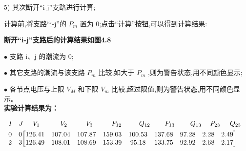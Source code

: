 \documentclass[a4paper]{ctexrep}
\begin{document}
                    5) 其次断开“i-j”支路进行计算;

                    计算前,将支路“i-j”的 $P_m$ 置为 0;点击“计算”按钮,可以得到计算结果:

                    \textbf{断开“i-j”支路后的计算结果如图4.8}

                    \quad $\bullet$ \quad 支路 i、j 的潮流为 0;

                    \quad $\bullet$ \quad 其它支路的潮流与该支路 $P_m$ 比较,如大于 $P_m$ ,则为警告状态,用不同颜色显示;
                    
                    \quad $\bullet$ \quad 各节点电压与上限 $V_M$ 和下限 $V_m$ 比较,超过限值,则为警告状态,用不同颜色显示。\\


                    \textbf{实验计算结果为：}

                    \begin{equation}
                        \begin{aligned}
                            & {\hspace{-0.2cm}\begin{tabular}{p{0.1cm} p{0.3cm} p{1.0cm} p{0.9cm} p{0.9cm} p{1cm} p{0.9cm} p{0.9cm} p{0.6cm} p{0.6cm} l}
                                $I$ & $J$ & $V_1$ & $V_2$ & $V_3$ & $P_{12}$ & $Q_{12}$ & $P_{13}$ & $Q_{13}$ & $P_{23}$ & $Q_{23}$ \\
                            \end{tabular}} \\
                                & {\begin{matrix}
                                0 & 0 \\
                                2 & 3 \\
                            \end{matrix}} {\left[\begin{matrix}
                                126.41 & 107.04 & 107.87 & 159.03 & 100.53 & 137.68 & 97.28 & 2.28 & 2.49 \\
                                126.49 & 108.01 & 108.69 & 153.39 & 95.18 & 133.75 & 92.92 & 2.68 & 2.17 \\
                            \end{matrix} \right]}
                        \end{aligned}
                    \end{equation} 
\end{document}
